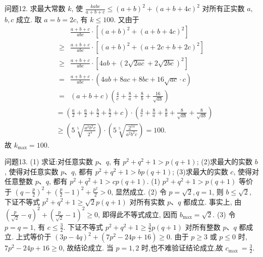 问题12. 求最大常数 $k$, 使 $\frac{k a b c}{a+b+c} \leqslant(a+b)^2+(a+b+4 c)^2$ 对所有正实数 $a$, $b, c$ 成立.
取 $a=b=2 c$, 有 $k \leqslant 100$. 又由于
$$
\begin{aligned}
& \frac{a+b+c}{a b c} \cdot\left[(a+b)^2+(a+b+4 c)^2\right] \\
\geqslant & \frac{a+b+c}{a b c} \cdot\left[(a+b)^2+(a+2 c+b+2 c)^2\right] \\
\geqslant & \frac{a+b+c}{a b c} \cdot\left[4 a b+(2 \sqrt{2 a c}+2 \sqrt{2 b c})^2\right] \\
= & \frac{a+b+c}{a b c} \cdot(4 a b+8 a c+8 b c+16 \sqrt{a c} \cdot c) \\
= & (a+b+c)\left(\frac{4}{c}+\frac{8}{a}+\frac{8}{b}+\frac{16}{\sqrt{a b}}\right)
\end{aligned}
$$
$$
\begin{aligned}
& =\left(\frac{a}{2}+\frac{a}{2}+\frac{b}{2}+\frac{b}{2}+c\right) \cdot\left(\frac{4}{c}+\frac{8}{a}+\frac{8}{b}+\frac{8}{\sqrt{a b}}+\frac{8}{\sqrt{a b}}\right) \\
& \geqslant\left(5 \sqrt[5]{\frac{a^2 b^2 c}{2^4}}\right) \cdot\left(5 \sqrt[5]{\frac{2^{14}}{a^2 b^2 c}}\right)=100 .
\end{aligned}
$$
故 $k_{\max }=100$.



问题13. (1) 求证:对任意实数 $p 、 q$, 有 $p^2+q^2+1>p(q+1)$;
(2)求最大的实数 $b$, 使得对任意实数 $p 、 q$, 都有 $p^2+q^2+1>b p(q+1)$;
(3)求最大的实数 $c$, 使得对任意整数 $p 、 q$, 都有 $p^2+q^2+1>c p(q+1)$.
(1) $p^2+q^2+1>p(q+1)$ 等价于 $\left(q-\frac{p}{2}\right)^2+\left(\frac{p}{2}-1\right)^2+\frac{p^2}{2}>0$, 显然成立.
(2) 令 $p=\sqrt{2}, q=1$, 则 $b \leqslant \sqrt{2}$, 下证不等式 $p^2+q^2+1 \geqslant \sqrt{2} p(q+1)$ 对所有实数 $p 、 q$ 都成立.
事实上, 由 $\left(\frac{p}{\sqrt{2}}-q\right)^2+\left(\frac{p}{\sqrt{2}}-1\right)^2 \geqslant 0$, 即得此不等式成立, 因而 $b_{\max }=\sqrt{2}$.
(3) 令 $p=q=1$, 有 $c \leqslant \frac{3}{2}$. 下证不等式 $p^2+q^2+1 \geqslant \frac{3}{2} p(q+1)$ 对所有整数 $p 、 q$ 都成立.
上式等价于 $(3 p-4 q)^2+\left(7 p^2-24 p+16\right) \geqslant 0$.
由于 $p \geqslant 3$ 或 $p \leqslant 0$ 时, $7 p^2-24 p+16 \geqslant 0$, 故结论成立.
当 $p=1,2$ 时,也不难验证结论成立,故 $c_{\text {max }}=\frac{3}{2}$.



